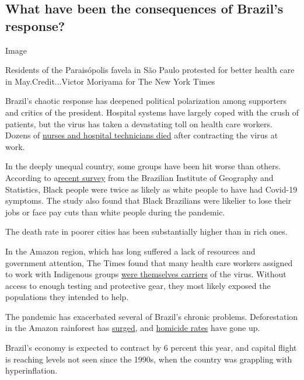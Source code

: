 \hypertarget{what-have-been-the-consequences-of-brazils-response}{%
\subsection{What have been the consequences of Brazil's
response?}\label{what-have-been-the-consequences-of-brazils-response}}

Image

Residents of the Paraisópolis favela in São Paulo protested for better
health care in May.Credit...Victor Moriyama for The New York Times

Brazil's chaotic response has deepened political polarization among
supporters and critics of the president. Hospital systems have largely
coped with the crush of patients, but the virus has taken a devastating
toll on health care workers. Dozens of
\href{https://www.nytimes3xbfgragh.onion/2020/05/16/world/americas/virus-brazil-deaths.html}{nurses
and hospital technicians died} after contracting the virus at work.

In the deeply unequal country, some groups have been hit worse than
others. According to
a\href{https://covid19.ibge.gov.br/pnad-covid/}{recent survey} from the
Brazilian Institute of Geography and Statistics, Black people were twice
as likely as white people to have had Covid-19 symptoms. The study also
found that Black Brazilians were likelier to lose their jobs or face pay
cuts than white people during the pandemic.

The death rate in poorer cities has been substantially higher than in
rich ones.

In the Amazon region, which has long suffered a lack of resources and
government attention, The Times found that many health care workers
assigned to work with Indigenous groups
\href{https://www.nytimes3xbfgragh.onion/2020/07/19/world/americas/coronavirus-brazil-indigenous.html}{were
themselves carriers} of the virus. Without access to enough testing and
protective gear, they most likely exposed the populations they intended
to help.

The pandemic has exacerbated several of Brazil's chronic problems.
Deforestation in the Amazon rainforest has
\href{https://www.nytimes3xbfgragh.onion/2020/06/06/world/americas/amazon-deforestation-brazil.html}{surged},
and
\href{https://g1.globo.com/monitor-da-violencia/noticia/2020/06/17/em-plena-quarentena-brasil-tem-alta-de-8percent-no-numero-de-assassinatos-em-abril.ghtml}{homicide
rates} have gone up.

Brazil's economy is expected to contract by 6 percent this year, and
capital flight is reaching levels not seen since the 1990s, when the
country was grappling with hyperinflation.

